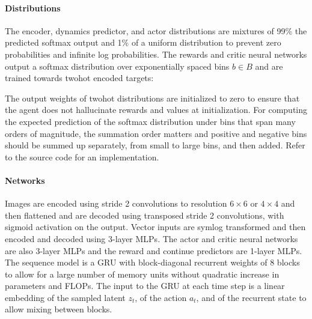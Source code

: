 \paragraph{Distributions}
The encoder, dynamics predictor, and actor distributions are mixtures of 99\% the predicted softmax output and 1\% of a uniform distribution \citep{gruslys2017reactor} to prevent zero probabilities and infinite log probabilities.
The rewards and critic neural networks output a softmax distribution over exponentially spaced bins $b \in B$ and are trained towards twohot encoded targets:


The output weights of twohot distributions are initialized to zero to ensure that the agent does not hallucinate rewards and values at initialization. For computing the expected prediction of the softmax distribution under bins that span many orders of magnitude, the summation order matters and positive and negative bins should be summed up separately, from small to large bins, and then added. Refer to the source code for an implementation.

\paragraph{Networks}
Images are encoded using stride 2 convolutions to resolution $6 \times 6$ or $4 \times 4$ and then flattened and are decoded using transposed stride 2 convolutions, with sigmoid activation on the output. Vector inputs are symlog transformed and then encoded and decoded using 3-layer MLPs. The actor and critic neural networks are also 3-layer MLPs and the reward and continue predictors are 1-layer MLPs.
The sequence model is a GRU\citep{cho2014gru} with block-diagonal recurrent weights \citep{van2019blockrnn} of 8 blocks to allow for a large number of memory units without quadratic increase in parameters and FLOPs. The input to the GRU at each time step is a linear embedding of the sampled latent $z_t$, of the action $a_t$, and of the recurrent state to allow mixing between blocks.

